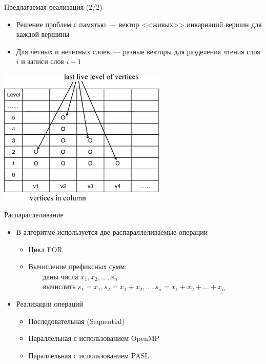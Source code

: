 \documentclass[hyperref=unicode,graphics=pdflatex,13pt]{beamer}
\begin{document}
\begin{frame}[shrink]{Предлагаемая реализация (2/2)}
\begin{itemize}
    \item Решение проблем с памятью~--- вектор <<живых>> инкарнаций вершин для каждой вершины
    \item Для четных и нечетных слоев~--- разные векторы для разделения чтения слоя $i$ и записи слоя $i+1$
\end{itemize}
\begin{center}\includegraphics[width=0.6\textwidth]{picture/vertices_in_column.png}\end{center}
\end{frame}

\begin{frame}[shrink]{Распараллеливание}
\begin{itemize}
    \item В алгоритме используется две распараллеливаемые операции
        \begin{itemize}
            \item Цикл FOR
            \item Вычисление префиксных сумм:
                  \\~~~~даны числа $x_{1}, x_{2}, ..., x_{n}$
                  \\~~~~вычислить $s_{1}=x_{1}, s_{2}=x_{1}+x_{2}, ..., s_{n}=x_{1}+x_{2}+...+x_{n}$
        \end{itemize}
    \item Реализации операций
        \begin{itemize}
            \item Последовательная (Sequential)
            \item Параллельная с использованием OpenMP
            \item Параллельная с использованием PASL
        \end{itemize}
\end{itemize}
\end{frame}
\end{document}
